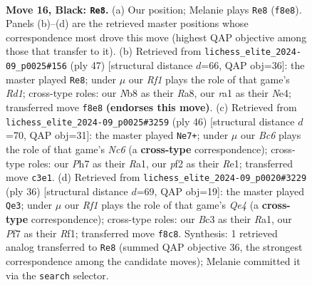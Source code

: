 \documentclass[11pt]{article}
\begin{document}
\clearpage

\begin{figure}[p]\centering
\begin{subfigure}{0.46\textwidth}\centering
\resizebox{\linewidth}{!}{%
\newchessgame
\chessboard[
  setfen={rn3rk1/p1p1Bp1p/6p1/3P4/2Q1P3/2b4q/P4P1P/R4RK1 b - - 0 16},
  showmover=false,
  pgfstyle=straightmove, color=movearrow, markmove={f8-e8}
]}
\caption{}
\end{subfigure}\hfill
\begin{subfigure}{0.46\textwidth}\centering
\resizebox{\linewidth}{!}{%
\newchessgame
\chessboard[
  setfen={r2r2k1/p3Bp1p/2p3p1/q7/2P1nP1Q/3b4/P5PP/2R1R1K1 b - - 4 24},
  showmover=false,
  pgfstyle=straightmove, color=movearrow, markmove={d8-e8}
]}
\caption{}
\end{subfigure}
\\[4pt]
\begin{subfigure}{0.46\textwidth}\centering
\resizebox{\linewidth}{!}{%
\newchessgame
\chessboard[
  setfen={r3r1k1/1Qp2ppp/p1Nq4/3p4/P7/1P6/2b2PPP/R3R1K1 w - - 0 24},
  showmover=false,
  pgfstyle=straightmove, color=movearrow, markmove={c6-e7}
]}
\caption{}
\end{subfigure}\hfill
\begin{subfigure}{0.46\textwidth}\centering
\resizebox{\linewidth}{!}{%
\newchessgame
\chessboard[
  setfen={r4rk1/ppq2pp1/2b1p2p/8/PP2Q3/2P2NP1/5PP1/R4RK1 w - - 1 19},
  showmover=false,
  pgfstyle=straightmove, color=movearrow, markmove={e4-e3}
]}
\caption{}
\end{subfigure}
\caption{\textbf{Move 16, Black: \texttt{Re8}.} (a) Our position; Melanie plays \texttt{Re8} (\texttt{f8e8}). Panels (b)--(d) are the retrieved master positions whose correspondence most drove this move (highest QAP objective among those that transfer to it). (b) Retrieved from \texttt{lichess\_elite\_2024-09\_p0025\#156} (ply 47) [structural distance $d$=66, QAP obj=36]: the master played \texttt{Re8}; under $\mu$ our \emph{Rf1} plays the role of that game's \emph{Rd1}; cross-type roles: our \emph{N}b8 as their \emph{R}a8, our \emph{r}a1 as their \emph{N}e4; transferred move \texttt{f8e8} \textbf{(endorses this move)}. (c) Retrieved from \texttt{lichess\_elite\_2024-09\_p0025\#3259} (ply 46) [structural distance $d$=70, QAP obj=31]: the master played \texttt{Ne7+}; under $\mu$ our \emph{Bc6} plays the role of that game's \emph{Nc6} (a \textbf{cross-type} correspondence); cross-type roles: our \emph{P}h7 as their \emph{R}a1, our \emph{p}f2 as their \emph{R}e1; transferred move \texttt{c3e1}. (d) Retrieved from \texttt{lichess\_elite\_2024-09\_p0020\#3229} (ply 36) [structural distance $d$=69, QAP obj=19]: the master played \texttt{Qe3}; under $\mu$ our \emph{Rf1} plays the role of that game's \emph{Qe4} (a \textbf{cross-type} correspondence); cross-type roles: our \emph{B}c3 as their \emph{R}a1, our \emph{P}f7 as their \emph{R}f1; transferred move \texttt{f8c8}. Synthesis: 1 retrieved analog transferred to \texttt{Re8} (summed QAP objective 36, the strongest correspondence among the candidate moves); Melanie committed it via the \texttt{search} selector.}
\label{fig:thought-m31}
\end{figure}
\end{document}
